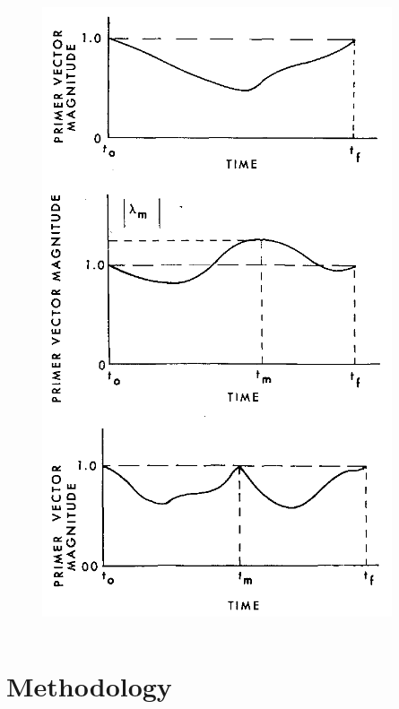 \documentclass[handout]{beamer}
\begin{document}
\begin{frame}
\begin{columns}
\begin{column}{0.3\linewidth}
\begin{figure}[htbp]
                \includegraphics[width=\linewidth]{img/primer_vector_history_from_jezewsky.png}
            \end{figure}
        \end{column}
    \end{columns}      
\end{frame}

\section{Methodology}
\end{document}
